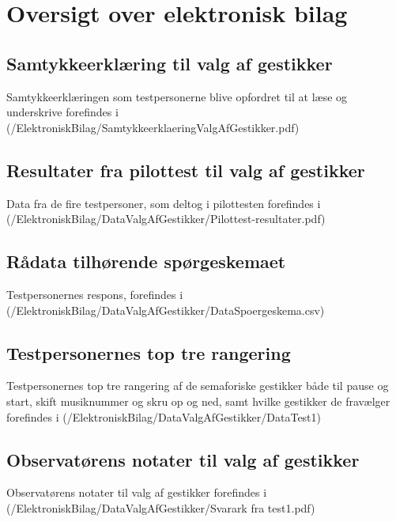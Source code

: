 \chapter{Oversigt over elektronisk bilag}
\label{app:OversigtOverElektroniskBilag}
%
%
\section{Samtykkeerklæring til valg af gestikker}
\label{app:SamtykkeerklaeringValgAfGestikker}
%
Samtykkeerklæringen som testpersonerne blive opfordret til at læse og underskrive forefindes i (/ElektroniskBilag/SamtykkeerklaeringValgAfGestikker.pdf)
%
\section{Resultater fra pilottest til valg af gestikker}
\label{app:ResultaterPilottestValgAfGestikker}
%
Data fra de fire testpersoner, som deltog i pilottesten forefindes i \\
(/ElektroniskBilag/DataValgAfGestikker/Pilottest-resultater.pdf)
%
\section{Rådata tilhørende spørgeskemaet}
\label{app:RaaDataSpoergeskema}
%
Testpersonernes respons, forefindes i (/ElektroniskBilag/DataValgAfGestikker/DataSpoergeskema.csv)
%
\section{Testpersonernes top tre rangering}
\label{app:TestpersonernesTopTre}
%
Testpersonernes top tre rangering af de semaforiske gestikker både til pause og start, skift musiknummer og skru op og ned, samt hvilke gestikker de fravælger forefindes i (/ElektroniskBilag/DataValgAfGestikker/DataTest1)
%
\section{Observatørens notater til valg af gestikker}
\label{app:NoterValgAfGestikker}
%
Observatørens notater til valg af gestikker forefindes i (/ElektroniskBilag/DataValgAfGestikker/Svarark fra test1.pdf)
%